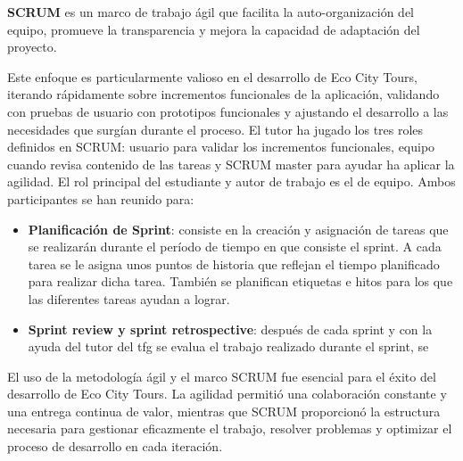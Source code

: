 \textbf{SCRUM} es un marco de trabajo ágil que facilita la auto-organización del equipo, promueve la transparencia y mejora la capacidad de adaptación del proyecto.

Este enfoque es particularmente valioso en el desarrollo de Eco City Tours, iterando rápidamente sobre incrementos funcionales de la aplicación, validando con pruebas de usuario con prototipos funcionales y ajustando el desarrollo a las necesidades que surgían durante el proceso. El tutor ha jugado los tres roles definidos en SCRUM: usuario para validar los incrementos funcionales, equipo cuando revisa contenido de las tareas y SCRUM master para ayudar ha aplicar la agilidad. El rol principal del estudiante y autor de trabajo es el de equipo. Ambos participantes se han reunido para:

\begin{itemize}
	\item \textbf{Planificación de Sprint}: consiste en la creación y asignación de tareas que se realizarán durante el período de tiempo en que consiste el sprint. A cada tarea se le asigna unos puntos de historia que reflejan el tiempo planificado para realizar dicha tarea. También se planifican etiquetas e hitos para los que las diferentes tareas ayudan a lograr.
	\item \textbf{Sprint review y sprint retrospective}: después de cada sprint y con la ayuda del tutor del \acrshort{tfg} se evalua el trabajo realizado durante el sprint, se 
	
\end{itemize}

El uso de la metodología ágil y el marco SCRUM fue esencial para el éxito del desarrollo de Eco City Tours. La agilidad permitió una colaboración constante y una entrega continua de valor, mientras que SCRUM proporcionó la estructura necesaria para gestionar eficazmente el trabajo, resolver problemas y optimizar el proceso de desarrollo en cada iteración.